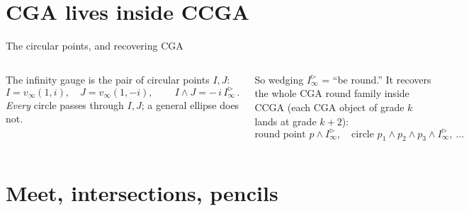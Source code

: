 \documentclass[aspectratio=169, 10pt]{beamer}
\newcommand{\Iinfd}{I_\infty^{\triangleright}}
\newcommand{\wed}{\wedge}
\newcommand{\vinf}{v_\infty}
\begin{document}
\section{CGA lives inside CCGA}

\begin{frame}[t]{The circular points, and recovering CGA}
  \setlength{\columnsep}{16pt}
  \begin{columns}[T]
      The infinity gauge \alert{is} the pair of \alert{circular points} $I,J$:
      \[
        I=\vinf(1,i),\quad J=\vinf(1,-i),\qquad
        \boxed{\,I\wed J = -\,i\,\Iinfd\,}.
      \]
      \vspace{0.1cm}
      \emph{Every} circle passes through $I,J$; a general ellipse does not.

      \vspace{0.5cm}
      So wedging $\Iinfd$ = ``be round.'' It recovers the \alert{whole CGA round
      family inside CCGA} (each CGA object of grade $k$ lands at grade $k{+}2$):
      \[
        \text{round point } p\wed\Iinfd,\quad
        \text{circle } p_1\wed p_2\wed p_3\wed\Iinfd,\ \dots
      \]

      \centering
  \end{columns}
\end{frame}

\section{Meet, intersections, pencils}
\end{document}
